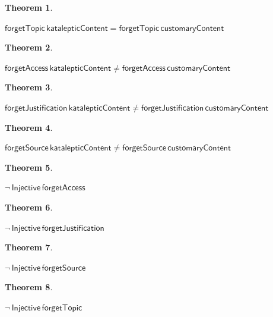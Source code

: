 \documentclass{article}
\newtheorem{theorem}{Theorem}
\newenvironment{leanstatement}
  {\par\noindent\ttfamily\begin{minipage}{0.94\linewidth}}
  {\end{minipage}\par}
\begin{document}
\begin{theorem}
\label{lean:historical_pair_collapses_under_forgetTopic}
\begin{leanstatement}
\(
  \mathsf{forgetTopic}\,\mathsf{katalepticContent}
  =
  \mathsf{forgetTopic}\,\mathsf{customaryContent}
\)
\end{leanstatement}
\end{theorem}

\begin{theorem}
\label{lean:historical_pair_survives_forgetAccess}
\begin{leanstatement}
\(
  \mathsf{forgetAccess}\,\mathsf{katalepticContent}
  \neq
  \mathsf{forgetAccess}\,\mathsf{customaryContent}
\)
\end{leanstatement}
\end{theorem}

\begin{theorem}
\label{lean:historical_pair_survives_forgetJustification}
\begin{leanstatement}
\(
  \mathsf{forgetJustification}\,\mathsf{katalepticContent}
  \neq
  \mathsf{forgetJustification}\,\mathsf{customaryContent}
\)
\end{leanstatement}
\end{theorem}

\begin{theorem}
\label{lean:historical_pair_survives_forgetSource}
\begin{leanstatement}
\(
  \mathsf{forgetSource}\,\mathsf{katalepticContent}
  \neq
  \mathsf{forgetSource}\,\mathsf{customaryContent}
\)
\end{leanstatement}
\end{theorem}

\begin{theorem}
\label{lean:forgetAccess_not_injective}
\begin{leanstatement}
\(
  \lnot\,\mathsf{Injective}\,\mathsf{forgetAccess}
\)
\end{leanstatement}
\end{theorem}

\begin{theorem}
\label{lean:forgetJustification_not_injective}
\begin{leanstatement}
\(
  \lnot\,\mathsf{Injective}\,\mathsf{forgetJustification}
\)
\end{leanstatement}
\end{theorem}

\begin{theorem}
\label{lean:forgetSource_not_injective}
\begin{leanstatement}
\(
  \lnot\,\mathsf{Injective}\,\mathsf{forgetSource}
\)
\end{leanstatement}
\end{theorem}

\begin{theorem}
\label{lean:forgetTopic_not_injective}
\begin{leanstatement}
\(
  \lnot\,\mathsf{Injective}\,\mathsf{forgetTopic}
\)
\end{leanstatement}
\end{theorem}
\end{document}
